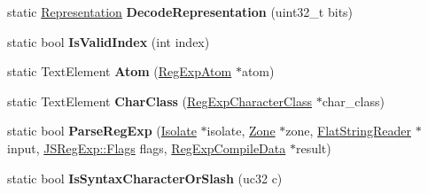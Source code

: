 \begin{DoxyCompactItemize}
\item 
static \hyperlink{classv8_1_1internal_1_1_representation}{Representation} {\bfseries Decode\+Representation} (uint32\+\_\+t bits)\hypertarget{classv8_1_1internal_1_1_b_a_s_e___e_m_b_e_d_d_e_d_adbee835b61095265e77c22757733fa0c}{}\label{classv8_1_1internal_1_1_b_a_s_e___e_m_b_e_d_d_e_d_adbee835b61095265e77c22757733fa0c}

\item 
static bool {\bfseries Is\+Valid\+Index} (int index)\hypertarget{classv8_1_1internal_1_1_b_a_s_e___e_m_b_e_d_d_e_d_a49a2c3b89c4e5249fc7623cfe0db8370}{}\label{classv8_1_1internal_1_1_b_a_s_e___e_m_b_e_d_d_e_d_a49a2c3b89c4e5249fc7623cfe0db8370}

\item 
static Text\+Element {\bfseries Atom} (\hyperlink{classv8_1_1internal_1_1_reg_exp_atom}{Reg\+Exp\+Atom} $\ast$atom)\hypertarget{classv8_1_1internal_1_1_b_a_s_e___e_m_b_e_d_d_e_d_a511ef91e8911a4d5dbd43c641e55143d}{}\label{classv8_1_1internal_1_1_b_a_s_e___e_m_b_e_d_d_e_d_a511ef91e8911a4d5dbd43c641e55143d}

\item 
static Text\+Element {\bfseries Char\+Class} (\hyperlink{classv8_1_1internal_1_1_reg_exp_character_class}{Reg\+Exp\+Character\+Class} $\ast$char\+\_\+class)\hypertarget{classv8_1_1internal_1_1_b_a_s_e___e_m_b_e_d_d_e_d_a9e39e1fd8ab8e8169157a4a45282d219}{}\label{classv8_1_1internal_1_1_b_a_s_e___e_m_b_e_d_d_e_d_a9e39e1fd8ab8e8169157a4a45282d219}

\item 
static bool {\bfseries Parse\+Reg\+Exp} (\hyperlink{classv8_1_1internal_1_1_isolate}{Isolate} $\ast$isolate, \hyperlink{classv8_1_1internal_1_1_zone}{Zone} $\ast$zone, \hyperlink{classv8_1_1internal_1_1_flat_string_reader}{Flat\+String\+Reader} $\ast$input, \hyperlink{classv8_1_1base_1_1_flags}{J\+S\+Reg\+Exp\+::\+Flags} flags, \hyperlink{structv8_1_1internal_1_1_reg_exp_compile_data}{Reg\+Exp\+Compile\+Data} $\ast$result)\hypertarget{classv8_1_1internal_1_1_b_a_s_e___e_m_b_e_d_d_e_d_aa3f94141cefe4417fedc1b31300cd70a}{}\label{classv8_1_1internal_1_1_b_a_s_e___e_m_b_e_d_d_e_d_aa3f94141cefe4417fedc1b31300cd70a}

\item 
static bool {\bfseries Is\+Syntax\+Character\+Or\+Slash} (uc32 c)\hypertarget{classv8_1_1internal_1_1_b_a_s_e___e_m_b_e_d_d_e_d_a021dccc884eb1e5bd7dfb7de7ce093e7}{}\label{classv8_1_1internal_1_1_b_a_s_e___e_m_b_e_d_d_e_d_a021dccc884eb1e5bd7dfb7de7ce093e7}


\end{DoxyCompactItemize}
